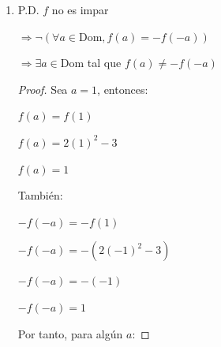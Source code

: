 \documentclass{article}
\begin{document}
\begin{enumerate}
\begin{enumerate}
\begin{enumerate}
                \(\Rightarrow \forall a \in \text{Dom}, f(a) = f(-a)\)
                
                \begin{proof} Sea \( a \in \text{Dom} \), entonces:
                
                \(f(a) = 2a^2 - 3 \)
                
                \vspace{\baselineskip}
                
                Ahora tomamos \( -a \):
                
                \( f(-a) = 2(-a)^2 - 3 \)
                
                \(f(-a) = 2a^2 - 3 \)
                \vspace{\baselineskip}
                
                Así
                
                \(f(a) = f(-a) \)
                \end{proof}

                \item[2.] P.D. \( f \) no es impar
                
                \(\Rightarrow \neg(\forall a \in \text{Dom}, f(a) = -f(-a))\)
                
                \(\Rightarrow \exists a \in \text{Dom}\) tal que \(f(a) \neq -f(-a)\)
                \begin{proof} Sea \(a = 1\), entonces:
                
                \(f(a) = f(1)\)
                
                \(f(a) = 2(1)^2 - 3\)
                
                \(f(a) = 1\)
                \vspace{\baselineskip}
                
                También:
                
                \(-f(-a) = -f(1)\)
                
                \(-f(-a) = -(2(-1)^2 - 3)\)
                
                \(-f(-a) = -(-1)\)
                
                \(-f(-a) = 1\)
                \vspace{\baselineskip}
                
                Por tanto, para algún \(a\):
                

\end{proof}
\end{enumerate}
\end{enumerate}
\end{enumerate}
\end{document}
